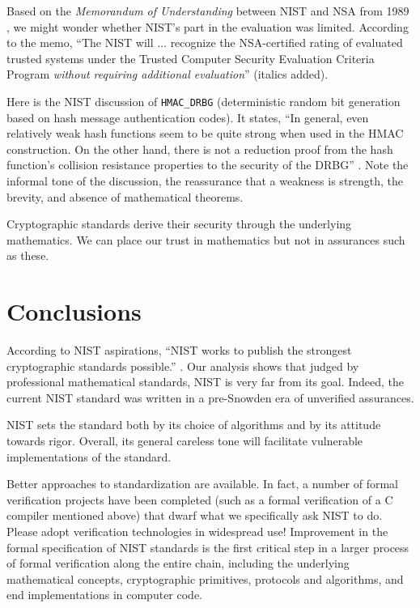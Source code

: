 \documentclass[11pt]{amsart} %
\begin{document}
Based on the {\it Memorandum of Understanding} between NIST and NSA from 1989 \cite[p.601]{ScAC}, we might
wonder whether NIST's part in the evaluation was limited.
According to the memo, ``The NIST will $\ldots$ recognize the NSA-certified rating of evaluated trusted
systems under the Trusted Computer Security Evaluation Criteria Program {\it without requiring additional
evaluation}'' (italics added). 

Here is the NIST discussion of {\tt HMAC\_DRBG}
(deterministic random bit generation based on hash message authentication codes).  It states, ``In general, even
relatively weak hash functions seem to be quite strong when used in the HMAC construction.
On the other hand, there is not a reduction proof from the hash function's collision resistance
properties to the security of the DRBG'' \cite[Appendix E.2]{NIST}. 
Note the informal tone of the discussion, the  reassurance
that a weakness is strength, the brevity, and absence of mathematical theorems.  

Cryptographic standards derive their security through the
underlying mathematics.   We can place our trust in mathematics but not in assurances such as these.

\section{Conclusions}


According to NIST aspirations,
``NIST works to publish the strongest cryptographic standards possible.'' \cite{NIST-Supp}.
Our analysis shows that judged by professional mathematical standards, NIST is 
very far from its goal. Indeed, the current NIST standard was written in a pre-Snowden era of unverified assurances.


NIST sets the standard both
by its choice of algorithms and by its attitude towards rigor.
Overall,  its general careless tone will 
facilitate vulnerable implementations of the standard.  

Better approaches to standardization are available.  In fact,
a number of formal verification projects have been completed (such as a formal verification of a C compiler
mentioned above) that dwarf what we specifically ask NIST  to do.  Please
adopt verification technologies in widespread use!
Improvement in the formal specification of NIST standards is the first
critical step in a larger process of formal verification along the entire chain, including
the
underlying mathematical concepts, cryptographic primitives, protocols and algorithms, 
and end implementations
in computer code.


 



\end{document}

